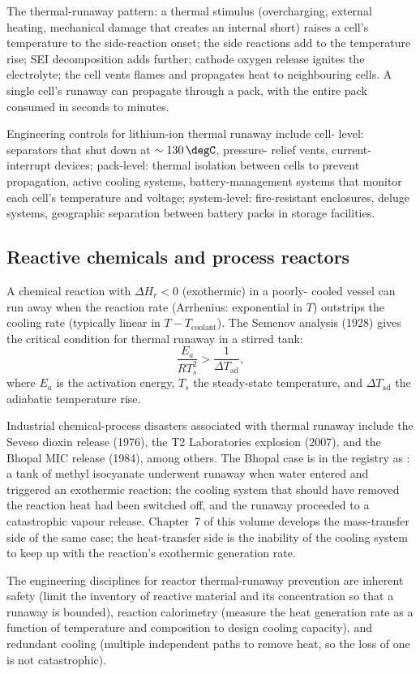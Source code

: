 The thermal-runaway pattern: a thermal stimulus (overcharging,
external heating, mechanical damage that creates an internal short)
raises a cell's temperature to the side-reaction onset; the side
reactions add to the temperature rise; SEI decomposition adds further;
cathode oxygen release ignites the electrolyte; the cell vents flames
and propagates heat to neighbouring cells. A single cell's runaway
can propagate through a pack, with the entire pack consumed in
seconds to minutes.

Engineering controls for lithium-ion thermal runaway include cell-
level: separators that shut down at $\sim 130\,\degC$, pressure-
relief vents, current-interrupt devices; pack-level: thermal
isolation between cells to prevent propagation, active cooling
systems, battery-management systems that monitor each cell's
temperature and voltage; system-level: fire-resistant enclosures,
deluge systems, geographic separation between battery packs in
storage facilities.

\subsection{Reactive chemicals and process reactors}

A chemical reaction with $\Delta H_r < 0$ (exothermic) in a poorly-
cooled vessel can run away when the reaction rate (Arrhenius:
exponential in $T$) outstrips the cooling rate (typically linear in
$T - T_{\text{coolant}}$). The Semenov analysis (1928) gives the
critical condition for thermal runaway in a stirred tank:
\[
\frac{E_a}{RT_s^2} > \frac{1}{\Delta T_{\text{ad}}},
\]
where $E_a$ is the activation energy, $T_s$ the steady-state
temperature, and $\Delta T_{\text{ad}}$ the adiabatic temperature rise.

Industrial chemical-process disasters associated with thermal runaway
include the Seveso dioxin release (1976), the T2 Laboratories
explosion (2007), and the Bhopal MIC release (1984), among others.
The Bhopal case is in the registry as
\cite{acc:icmr-bhopal-2004}: a tank of methyl isocyanate
underwent runaway when water entered and triggered an exothermic
reaction; the cooling system that should have removed the reaction
heat had been switched off, and the runaway proceeded to a
catastrophic vapour release. Chapter~7 of this volume develops the
mass-transfer side of the same case; the heat-transfer side is the
inability of the cooling system to keep up with the reaction's
exothermic generation rate.

The engineering disciplines for reactor thermal-runaway prevention
are inherent safety (limit the inventory of reactive material and
its concentration so that a runaway is bounded), reaction calorimetry
(measure the heat generation rate as a function of temperature and
composition to design cooling capacity), and redundant cooling
(multiple independent paths to remove heat, so the loss of one is
not catastrophic).

